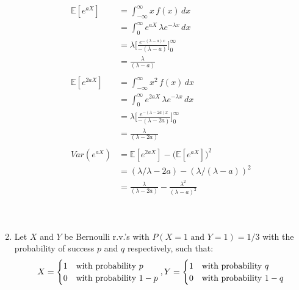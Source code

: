 \documentclass{article}
\begin{document}
\begin{enumerate}
    \begin{equation}
        \begin{split}
        \mathbb{E}{[e^{aX}]} & = \int_{-\infty}^{\infty}x \,f(x) \, dx \\
        &= \int_{0}^{\infty} e^{aX} \, \lambda e^{-\lambda x} \, dx \\
        &= \lambda \bigg[\frac{e^{-(\lambda-a)x}}{-(\lambda-a)} \bigg]_{0}^{\infty}\\
        &= \frac{\lambda}{(\lambda-a)}\\~\\
        \mathbb{E}{[e^{2aX}]} & = \int_{-\infty}^{\infty}x^{2} \,f(x) \, dx \\
        &= \int_{0}^{\infty} e^{2aX} \, \lambda e^{-\lambda x} \, dx \\
        &= \lambda \bigg[\frac{e^{-(\lambda-2a)x}}{-(\lambda-2a)} \bigg]_{0}^{\infty}\\
        &= \frac{\lambda}{(\lambda-2a)}\\~\\
        Var(e^{aX}) &= \mathbb{E}{[e^{2aX}]} - (\mathbb{E}{[e^{aX}])^2}\\
        &= (\lambda / \lambda - 2a) - (\lambda/(\lambda-a))^{2}\\
        &= \frac{\lambda}{(\lambda-2a)} - {\frac{\lambda^{2}}{(\lambda-a)^{2}}}
        \end{split}
    \end{equation}\\~\\

    \item Let $X$ and $Y$ be Bernoulli r.v.'s with $P(X = 1 \text{ and } Y = 1) = 1/3$ with the probability of success $p$ and $q$ respectively, such that:\\

    \begin{equation}\nonumber
    X = \begin{cases}
        1 & \text{with probability } p\\
        0 & \text{with probability } 1-p
        \end{cases},\\~\\
    Y = \begin{cases}
        1 & \text{with probability } q\\
        0 & \text{with probability } 1-q
        \end{cases}
    \end{equation}\\


\end{enumerate}
\end{document}
